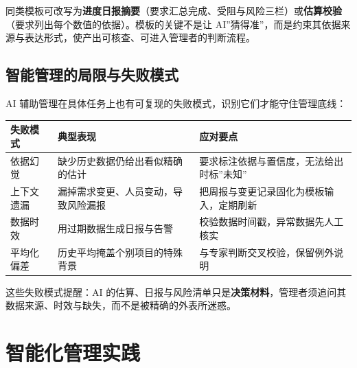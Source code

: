 \documentclass[
]{ctexbook}
\newcounter{none}
\begin{document}
同类模板可改写为\textbf{进度日报摘要}（要求汇总完成、受阻与风险三栏）或\textbf{估算校验}（要求列出每个数值的依据）。模板的关键不是让
AI''猜得准''，而是约束其依据来源与表达形式，使产出可核查、可进入管理者的判断流程。

\subsection{智能管理的局限与失败模式}\label{ux667aux80fdux7ba1ux7406ux7684ux5c40ux9650ux4e0eux5931ux8d25ux6a21ux5f0f}

AI 辅助管理在具体任务上也有可复现的失败模式，识别它们才能守住管理底线：

{\def\LTcaptype{none} %
\begin{longtable}[]{@{}
  >{\raggedright\arraybackslash}p{}
  >{\raggedright\arraybackslash}p{}
  >{\raggedright\arraybackslash}p{}@{}}
\toprule\noalign{}
\begin{minipage}[b]{\linewidth}\raggedright
失败模式
\end{minipage} & \begin{minipage}[b]{\linewidth}\raggedright
典型表现
\end{minipage} & \begin{minipage}[b]{\linewidth}\raggedright
应对要点
\end{minipage} \\
\midrule\noalign{}
\endhead
\bottomrule\noalign{}
\endlastfoot
依据幻觉 & 缺少历史数据仍给出看似精确的估计 &
要求标注依据与置信度，无法给出时标''未知'' \\
上下文遗漏 & 漏掉需求变更、人员变动，导致风险漏报 &
把周报与变更记录固化为模板输入，定期刷新 \\
数据时效 & 用过期数据生成日报与告警 &
校验数据时间戳，异常数据先人工核实 \\
平均化偏差 & 历史平均掩盖个别项目的特殊背景 &
与专家判断交叉校验，保留例外说明 \\
\end{longtable}
}

这些失败模式提醒：AI
的估算、日报与风险清单只是\textbf{决策材料}，管理者须追问其数据来源、时效与缺失，而不是被精确的外表所迷惑。

\section{智能化管理实践}\label{ux667aux80fdux5316ux7ba1ux7406ux5b9eux8df5}
\end{document}
